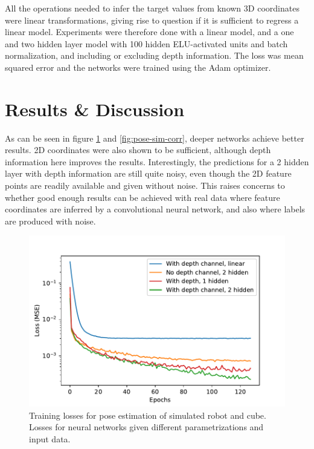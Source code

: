 All the operations needed to infer the target values from known 3D coordinates
were linear transformations, giving rise to question if it is sufficient to
regress a linear model. Experiments were therefore done with a linear model,
and a one and two hidden layer model with 100 hidden ELU-activated units and
batch normalization, and including or excluding depth information. The loss was
mean squared error and the networks were trained using the Adam optimizer.

\section{Results \& Discussion}

As can be seen in figure \ref{fig:pose-sim-losses} and \ref{fig:pose-sim-corr},
deeper networks achieve better results. 2D coordinates were also shown to be
sufficient, although depth information here improves the results.
Interestingly, the predictions for a 2 hidden layer with depth information are
still quite noisy, even though the 2D feature points are readily available and
given without noise. This raises concerns to whether good enough results can be
achieved with real data where feature coordinates are inferred by a
convolutional neural network, and also where labels are produced with noise.

\begin{figure}[h!]
    \centering
    \includegraphics[width=0.7 \textwidth]{res/pose_sim_losses.pdf}

    \caption{Training losses for pose estimation of simulated robot and cube.
    Losses for neural networks given different parametrizations and input
    data.}

    \label{fig:pose-sim-losses}
    
\end{figure}

